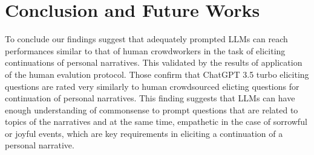 \chapter{Conclusion and Future Works}
\label{cha:conclusion}
To conclude our findings suggest that adequately prompted LLMs can reach performances similar to that of human crowdworkers in the task of eliciting continuations of personal narratives. This validated by the results of application of the human evalution protocol. Those confirm that ChatGPT 3.5 turbo eliciting questions are rated very similarly to human crowdsourced elicting questions for continuation of personal narratives. This finding suggests that LLMs can have enough understanding of commonsense to prompt questions that are related to topics of the narratives and at the same time, empathetic in the case of sorrowful or joyful events, which are key requirements in eliciting a continuation of a personal narrative.


